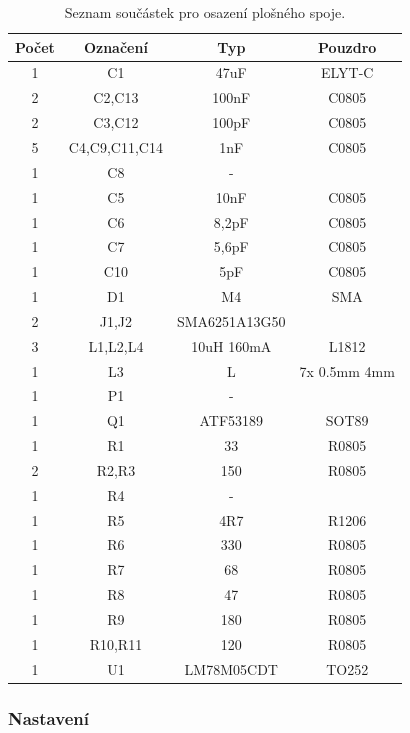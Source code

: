 \documentclass[12pt,a4paper,oneside]{article}
\begin{document}
\begin{savenotes}
\begin{table}[h!]
\begin{center}
\begin{tabular}{ |c|c|c|c| }
\hline 
Počet & Označení & Typ  & Pouzdro  \\ 
\hline 
1	&	C1	&	47uF	&	ELYT-C	\\
2	&	C2,C13	&	100nF	&	C0805	\\
2	&	C3,C12	&	100pF	&	C0805	\\
5	&	C4,C9,C11,C14	&	1nF	&	C0805	\\
1	&	C8	&	-	&		\\
1	&	C5	&	10nF	&	C0805	\\
1	&	C6	&	8,2pF	&	C0805	\\
1	&	C7	&	5,6pF	&	C0805	\\
1	&	C10	&	5pF	&	C0805	\\
1	&	D1	&	M4	&	SMA	\\
2	&	J1,J2	&	SMA6251A13G50	&		\\
3	&	L1,L2,L4	&	10uH 160mA	&	L1812	\\
1	&	L3	&	L	&	7x 0.5mm 4mm	\\
1	&	P1	&	-	&		\\
1	&	Q1	&	ATF53189	&	SOT89	\\
1	&	R1	&	33	&	R0805	\\
2	&	R2,R3	&	150	&	R0805	\\
1	&	R4	&	-	&		\\
1	&	R5	&	4R7	&	R1206	\\
1	&	R6	&	330	&	R0805	\\
1	&	R7	&	68	&	R0805	\\
1	&	R8	&	47	&	R0805	\\
1	&	R9	&	180	&	R0805	\\
1	&	R10,R11	&	120	&	R0805	\\
1	&	U1	&	LM78M05CDT	&	TO252	\\
\hline 
\end{tabular}
\end{center}
\caption{Seznam součástek pro osazení plošného spoje.}
\label{seznam_soucastek}
\end{table}
\end{savenotes}

\newpage



\subsubsection{Nastavení}
\end{document}
